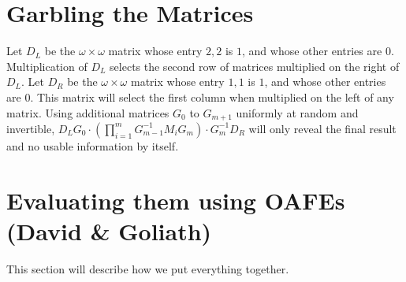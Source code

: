 \documentclass[12pt, a4paper]{article}
\begin{document}
\section{Garbling the Matrices}

Let $D_L$ be the $\omega \times \omega$ matrix whose entry $2,2$ is $1$, and
whose other entries are $0$. Multiplication of $D_L$ selects the second row of
matrices multiplied on the right of $D_L$. Let $D_R$ be the $\omega \times
\omega$ matrix whose entry $1,1$ is $1$, and whose other entries are $0$. This
matrix will select the first column when multiplied on the left of any matrix.
Using additional matrices $G_0$ to $G_{m+1}$ uniformly at random and invertible,
$D_L G_0 \cdot ( \prod_{i=1}^m G_{m-1}^{-1} M_i G_m ) \cdot G_m^{-1} D_R$ will
only reveal the final result and no usable information by itself\cite{cramer03}.

\section{Evaluating them using OAFEs (David \& Goliath)}

This section will describe how we put everything together.


\end{document}
